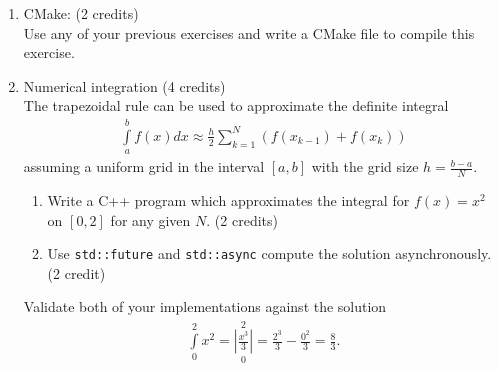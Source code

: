 \documentclass[11pt]{article}
\begin{document}
\begin{enumerate}

\item CMake: (2 credits)\\
Use any of your previous exercises and write a CMake file to compile this exercise.
\item Numerical integration (4 credits)\\
The trapezoidal rule can be used to approximate the definite integral 
\begin{align*}
\int\limits_a^b f(x) dx \approx \frac{h}{2} \sum\limits_{k=1}^N (f(x_{k-1}) + f(x_k))
\end{align*}
assuming a uniform grid in the interval $[a,b]$ with the grid size $h=\frac{b-a}{N}$.
\begin{enumerate}
\item Write a C++ program which approximates the integral for $f(x)=x^2$ on $[0,2]$ for any given $N$. (2 credits)
\item Use \lstinline|std::future| and \lstinline|std::async| compute the solution asynchronously. (2 credit)
\end{enumerate}
Validate both of your implementations against the solution 
\begin{align*}
\int\limits_0^2 x^2 = \left\vert \frac{x^3}{3}\right\vert\limits_0^2 = \frac{2^3}{3} - \frac{0^2}{3} = \frac{8}{3}\text{.}
\end{align*}

\end{enumerate}

\doclicenseThis 
\end{document}

